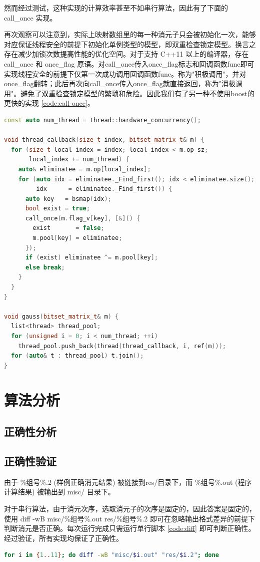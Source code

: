 \documentclass[a4paper]{article}
\begin{document}
然而经过测试，这种实现的计算效率甚至不如串行算法，因此有了下面的 call\_once 实现。

再次观察可以注意到，实际上映射数组里的每一种消元子只会被初始化一次，能够对应保证线程安全的前提下初始化单例类型的模型，即双重检查锁定模型。换言之存在减少加锁次数提高性能的优化空间。对于支持 C++11 以上的编译器，存在 call\_once 和 once\_flag 原语。对call\_once传入once\_flag标志和回调函数func即可实现线程安全的前提下仅第一次成功调用回调函数func。称为"积极调用"，并对once\_flag翻转；此后再次向call\_once传入once\_flag就直接返回，称为"消极调用"。避免了双重检查锁定模型的繁琐和危险。因此我们有了另一种不使用boost的更快的实现 \ref{code:call-once}。

\begin{lstlisting}[frame=trbl, language={C++}, caption={call\_once 位元矩阵消元部分}, label={code:call-once}]
const auto num_thread = thread::hardware_concurrency();

void thread_callback(size_t index, bitset_matrix_t& m) {
  for (size_t local_index = index; local_index < m.op_sz;
       local_index += num_thread) {
    auto& eliminatee = m.op[local_index];
    for (auto idx = eliminatee._Find_first(); idx < eliminatee.size();
         idx      = eliminatee._Find_first()) {
      auto key   = bsmap(idx);
      bool exist = true;
      call_once(m.flag_v[key], [&]() {
        exist       = false;
        m.pool[key] = eliminatee;
      });
      if (exist) eliminatee ^= m.pool[key];
      else break;
    }
  }
}

void gauss(bitset_matrix_t& m) {
  list<thread> thread_pool;
  for (unsigned i = 0; i < num_thread; ++i)
    thread_pool.push_back(thread(thread_callback, i, ref(m)));
  for (auto& t : thread_pool) t.join();
}
\end{lstlisting}

\section{算法分析}
\subsection{正确性分析}

\subsection{正确性验证}
由于 \%组号\%.2 (样例正确消元结果) 被链接到res/目录下，而 \%组号\%.out (程序计算结果) 被输出到 misc/ 目录下。

对于串行算法，由于消元次序，选取消元子的次序是固定的，因此答案是固定的，使用 diff -wB misc/\%组号\%.out res/\%组号\%.2 即可在忽略输出格式差异的前提下判断消元是否正确。每次运行完成只需运行单行脚本 \ref{code:diff} 即可判断正确性。经过验证，所有实现均保证了正确性。
\begin{lstlisting}[frame=trbl, language={bash}, caption={单行 Bash 脚本}, label = {code:diff}]
  for i in {1..11}; do diff -wB "misc/$i.out" "res/$i.2"; done
\end{lstlisting}
\end{document}
